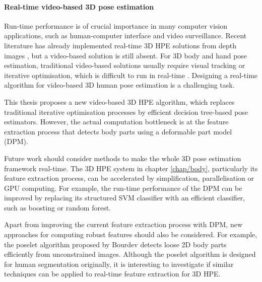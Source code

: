 \paragraph{Real-time video-based 3D pose estimation}
Run-time performance is of crucial importance in many computer vision applications, such as human-computer interface and video surveillance. Recent literature has already implemented real-time 3D HPE solutions from depth images \cite{Baak2011, Girshick2011, Sun2012}, but a video-based solution is still absent. For 3D body and hand pose estimation, traditional video-based solutions usually require visual tracking or iterative optimisation, which is difficult to run in real-time \cite{Pons-Moll2011, Sigal2012}. Designing a real-time algorithm for video-based 3D human pose estimation is a challenging task. 

This thesis proposes a new video-based 3D HPE algorithm, which replaces traditional iterative optimisation processes by efficient decision tree-based pose estimators. However, the actual computation bottleneck is at the feature extraction process that detects body parts using a deformable part model (DPM). 

Future work should consider methods to make the whole 3D pose estimation framework real-time. 
The 3D HPE system in chapter \ref{chap/body}, particularly its feature extraction process, can be accelerated by simplification, parallelisation or GPU computing. 
For example, the run-time performance of the DPM can be improved by replacing its structured SVM classifier \cite{Yang2011} with an efficient classifier, such as boosting or random forest.

Apart from improving the current feature extraction process with DPM, new approaches for computing robust features should also be considered. 
For example, the poselet algorithm proposed by Bourdev \etal \cite{Bourdev2009} detects loose 2D body parts efficiently from unconstrained images. Although the poselet algorithm is designed for human segmentation originally, it is interesting to investigate if similar techniques can be applied to real-time feature extraction for 3D HPE. 

